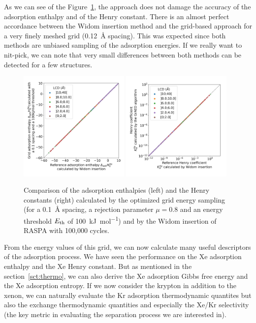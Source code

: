 \documentclass[main]{subfiles}
\begin{document}
As we can see of the Figure~\ref{fgr:grid_widom}, the approach does not damage the accuracy of the adsorption enthalpy and of the Henry constant. There is an almost perfect accordance between the Widom insertion method and the grid-based approach for a very finely meshed grid (\SI{0.12}{\angstrom} spacing). This was expected since both methods are unbiased sampling of the adsorption energies. If we really want to nit-pick, we can note that very small differences between both methods can be detected for a few structures.


\begin{figure}[ht]
  \centering
    \includegraphics[width=0.48\textwidth]{figures/3-fastsim/H_Xe_widom_vs_H_Xe_grid_overview.jpg}
    \includegraphics[width=0.48\textwidth]{figures/3-fastsim/K_Xe_widom_vs_K_Xe_grid_overview.jpg}
    \caption{Comparison of the adsorption enthalpies (left) and the Henry constants (right) calculated by the optimized grid energy sampling (for a \SI{0.1}{\angstrom} spacing, a rejection parameter $\mu=0.8$ and an energy threshold $E_{\text{th}}$ of \SI{100}{\kilo\joule\per\mole}) and by the Widom insertion of RASPA with 100,000 cycles. }\label{fgr:grid_widom}
\end{figure}

From the energy values of this grid, we can now calculate many useful descriptors of the adsorption process. We have seen the performance on the Xe adsorption enthalpy and the Xe Henry constant. But as mentioned in the section~\ref{sct:thermo}, we can also derive the Xe adsorption Gibbs free energy and the Xe adsorption entropy. If we now consider the krypton in addition to the xenon, we can naturally evaluate the Kr adsorption thermodynamic quantites but also the exchange thermodynamic quantities and especially the Xe/Kr selectivity (the key metric in evaluating the separation process we are interested in).
\end{document}
